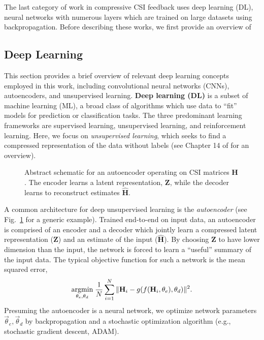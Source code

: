 The last category of work in compressive CSI feedback uses deep learning (DL), neural networks with numerous layers which are trained on large datasets using backpropagation. Before describing these works, we first provide an overview of 

\subsection{Deep Learning}
\label{sect:dl_overview}

This section provides a brief overview of relevant deep learning concepts employed in this work, including convolutional neural networks (CNNs), autoencoders, and unsupervised learning. \textbf{Deep learning (DL)} is a subset of machine learning (ML), a broad class of algorithms which use data to ``fit'' models for prediction or classification tasks. The three predominant learning frameworks are supervised learning, unsupervised learning, and reinforcement learning. Here, we focus on \emph{unsupervised learning}, which seeks to find a compressed representation of the data without labels (see Chapter 14 of \cite{ref:Hastie2016Elements} for an overview).

\begin{figure}[!hbtp]
\centering
\def\svgwidth{0.8\columnwidth}

\caption{Abstract schematic for an autoencoder operating on CSI matrices $\mathbf H$. The encoder learns a latent representation, $\mathbf Z$, while the decoder learns to reconstruct estimates $\hat{\mathbf H}$.}
\label{fig:autoencoder_schematic}
\end{figure}

A common architecture for deep unsupervised learning is the \emph{autoencoder} (see Fig.~\ref{fig:autoencoder_schematic} for a generic example). Trained end-to-end on input data, an autoencoder is comprised of an encoder and a decoder which jointly learn a compressed latent representation ($\mathbf Z$) and an estimate of the input ($\hat{\mathbf H}$). By choosing $\mathbf Z$ to have lower dimension than the input, the network is forced to learn a ``useful'' summary of the input data. The typical objective function for such a network is the mean squared error,
\begin{align*}
\underset{\theta_e, \theta_d}{\text{argmin}}\; \frac 1N \sum_{i=1}^N\Arrowvert \mathbf H_i - g(f(\mathbf H_i, \theta_e), \theta_d) \Arrowvert^2.
\end{align*}
Presuming the autoencoder is a neural network, we optimize network parameters $\vec \theta_e, \vec \theta_d$ by backpropagation and a stochastic optimization algorithm (e.g., stochastic gradient descent, ADAM).

